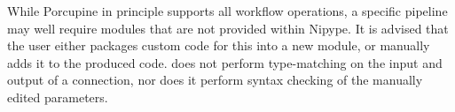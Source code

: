 While Porcupine in principle supports all workflow operations, a specific pipeline may well require modules that are not provided within Nipype. It is advised that the user either packages custom code for this into a new module, or manually adds it to the produced code.  does not perform type-matching on the input and output of a connection, nor does it perform syntax checking of the manually edited parameters.